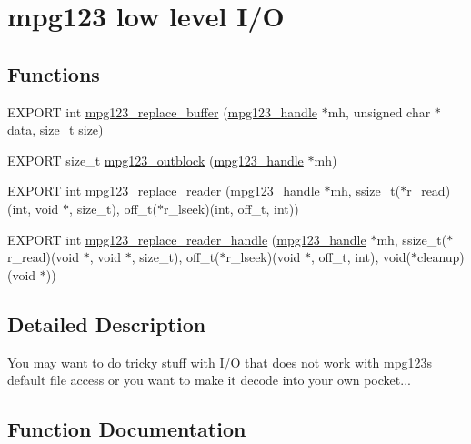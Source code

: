 \hypertarget{group__mpg123__lowio}{}\section{mpg123 low level I/O}
\label{group__mpg123__lowio}
\subsection*{Functions}
\begin{DoxyCompactItemize}
\item 
E\+X\+P\+O\+RT int \hyperlink{group__mpg123__lowio_ga4004912737be35ad51ff4dac17022407}{mpg123\+\_\+replace\+\_\+buffer} (\hyperlink{group__mpg123__init_ga6728e2839a395f3a07d4514da659faca}{mpg123\+\_\+handle} $\ast$mh, unsigned char $\ast$data, size\+\_\+t size)
\item 
E\+X\+P\+O\+RT size\+\_\+t \hyperlink{group__mpg123__lowio_ga07215fe811cff7925517e5548768e652}{mpg123\+\_\+outblock} (\hyperlink{group__mpg123__init_ga6728e2839a395f3a07d4514da659faca}{mpg123\+\_\+handle} $\ast$mh)
\item 
E\+X\+P\+O\+RT int \hyperlink{group__mpg123__lowio_ga8112b25fedb2d52c76abb1b103e6e2cc}{mpg123\+\_\+replace\+\_\+reader} (\hyperlink{group__mpg123__init_ga6728e2839a395f3a07d4514da659faca}{mpg123\+\_\+handle} $\ast$mh, ssize\+\_\+t($\ast$r\+\_\+read)(int, void $\ast$, size\+\_\+t), off\+\_\+t($\ast$r\+\_\+lseek)(int, off\+\_\+t, int))
\item 
E\+X\+P\+O\+RT int \hyperlink{group__mpg123__lowio_gacce158687fce659acb242952b0a30916}{mpg123\+\_\+replace\+\_\+reader\+\_\+handle} (\hyperlink{group__mpg123__init_ga6728e2839a395f3a07d4514da659faca}{mpg123\+\_\+handle} $\ast$mh, ssize\+\_\+t($\ast$r\+\_\+read)(void $\ast$, void $\ast$, size\+\_\+t), off\+\_\+t($\ast$r\+\_\+lseek)(void $\ast$, off\+\_\+t, int), void($\ast$cleanup)(void $\ast$))
\end{DoxyCompactItemize}


\subsection{Detailed Description}
You may want to do tricky stuff with I/O that does not work with mpg123\textquotesingle{}s default file access or you want to make it decode into your own pocket... 

\subsection{Function Documentation}
\mbox{\label{group__mpg123__lowio_ga07215fe811cff7925517e5548768e652}} 
